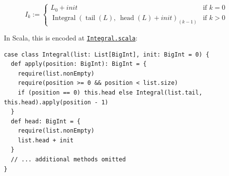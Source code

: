 \begin{equation*}
I_k :=
\begin{cases}
L_0 + init & \text{if } k = 0 \\
\operatorname{Integral}(\operatorname{tail}(L),\ \operatorname{head}(L) + init)_{(k - 1)} & \text{if } k > 0
\end{cases}
\end{equation*}

In Scala, this is encoded at
\href{https://github.com/thiagomata/prime-numbers/blob/master/src/main/scala/v1/chapter3/list/integral/Integral.scala}{\texttt{Integral.scala}}:

\begin{lstlisting}[style=scala]
case class Integral(list: List[BigInt], init: BigInt = 0) {
  def apply(position: BigInt): BigInt = {
    require(list.nonEmpty)
    require(position >= 0 && position < list.size)
    if (position == 0) this.head else Integral(list.tail, this.head).apply(position - 1)
  }
  def head: BigInt = {
    require(list.nonEmpty)
    list.head + init
  }
  // ... additional methods omitted
}
\end{lstlisting}
